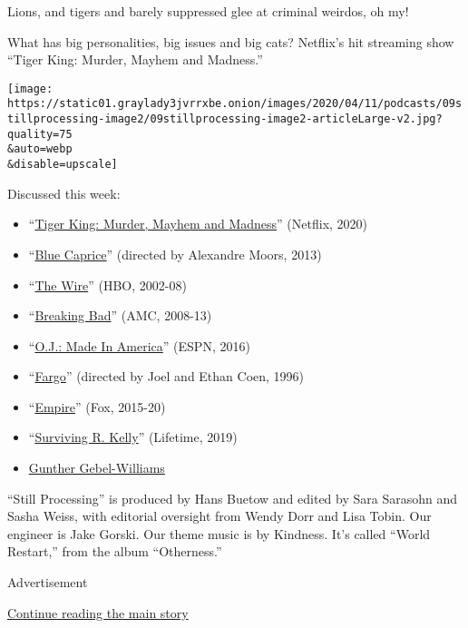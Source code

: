Lions, and tigers and barely suppressed glee at criminal weirdos, oh my!

What has big personalities, big issues and big cats? Netflix's hit
streaming show ``Tiger King: Murder, Mayhem and Madness.''

\texttt{[image: https://static01.graylady3jvrrxbe.onion/images/2020/04/11/podcasts/09stillprocessing-image2/09stillprocessing-image2-articleLarge-v2.jpg?quality=75\\\&auto=webp\\\&disable=upscale]}

Discussed this week:

\begin{itemize}
\item
  ``\href{https://www.netflix.com/title/81115994}{Tiger King: Murder,
  Mayhem and Madness}'' (Netflix, 2020)
\item
  ``\href{https://www.imdb.com/title/tt2027064/}{Blue Caprice}''
  (directed by Alexandre Moors, 2013)
\item
  ``\href{https://www.imdb.com/title/tt0306414/}{The Wire}'' (HBO,
  2002-08)
\item
  ``\href{https://www.imdb.com/title/tt0903747/}{Breaking Bad}'' (AMC,
  2008-13)
\item
  ``\href{https://www.imdb.com/title/tt5275892/}{O.J.: Made In
  America}'' (ESPN, 2016)
\item
  ``\href{https://www.imdb.com/title/tt0116282/}{Fargo}'' (directed by
  Joel and Ethan Coen, 1996)
\item
  ``\href{https://www.imdb.com/title/tt3228904/}{Empire}'' (Fox,
  2015-20)
\item
  ``\href{https://www.imdb.com/title/tt8385496/}{Surviving R. Kelly}''
  (Lifetime, 2019)
\item
  \href{https://www.google.com/search?q=gunther+gebel+williams\&client=safari\&rls=en\&sxsrf=ALeKk02wBMUiTlTj1jh_juFOVUu_Z1hPiw:1586204061513\&source=lnms\&tbm=isch\&sa=X\&ved=2ahUKEwjft4LNztToAhXvmOAKHXNADh0Q_AUoAnoECBYQBA\&biw=1694\&bih=957}{Gunther
  Gebel-Williams}
\end{itemize}

``Still Processing'' is produced by Hans Buetow and edited by Sara
Sarasohn and Sasha Weiss, with editorial oversight from Wendy Dorr and
Lisa Tobin. Our engineer is Jake Gorski. Our theme music is by Kindness.
It's called ``World Restart,'' from the album ``Otherness.''

Advertisement

\protect\hyperlink{after-bottom}{Continue reading the main story}

